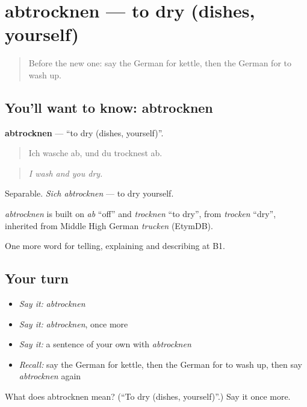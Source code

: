 \section[abtrocknen]{abtrocknen — to dry (dishes, yourself)}

\label{lesson:GE-C531-abtrocknen}



\begin{quote}
Before the new one: say the German for kettle, then the German for to wash up.
\end{quote}

\subsection*{You'll want to know: abtrocknen}
\textbf{abtrocknen} — \textquotedblleft{}to dry (dishes, yourself)\textquotedblright{}.

\begin{quote}
Ich wasche ab, und du trocknest ab.
\end{quote}

\begin{quote}
\emph{I wash and you dry.}
\end{quote}

Separable. \emph{Sich abtrocknen} — to dry yourself.

\begin{cousinweb}
\emph{abtrocknen} is built on \emph{ab} \textquotedblleft{}off\textquotedblright{} and \emph{trocknen} \textquotedblleft{}to dry\textquotedblright{}, from \emph{trocken} \textquotedblleft{}dry\textquotedblright{}, inherited from Middle High German \emph{trucken} (EtymDB).
\end{cousinweb}

\begin{grammarlens}[title={What you've built}]
One more word for telling, explaining and describing at B1.
\end{grammarlens}

\subsection*{Your turn}
\begin{itemize}
\raggedright
  \item \emph{Say it:} \emph{abtrocknen}
  \item \emph{Say it:} \emph{abtrocknen}, once more
  \item \emph{Say it:} a sentence of your own with \emph{abtrocknen}
  \item \emph{Recall:} say the German for kettle, then the German for to wash up, then say \emph{abtrocknen} again
\end{itemize}

\begin{tcolorbox}[breakable,colback=teal!4,colframe=teal!35!black,title={Before you move on}]
What does abtrocknen mean? (\textquotedblleft{}To dry (dishes, yourself)\textquotedblright{}.) Say it once more.
\end{tcolorbox}
